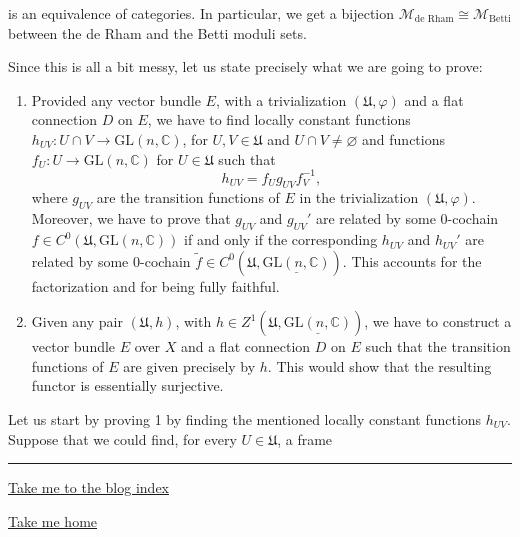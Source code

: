 \documentclass[]{article}
\begin{document}
is an equivalence of categories. In particular, we get a bijection
\(\mathcal{M}_{\text{de Rham}} \cong \mathcal{M}_{\text{Betti}}\)
between the de Rham and the Betti moduli sets.

Since this is all a bit messy, let us state precisely what we are going
to prove:

\begin{enumerate}
\def\labelenumi{\arabic{enumi}.}
\item
  Provided any vector bundle \(E\), with a trivialization
  \((\mathfrak{U},\varphi)\) and a flat connection \(D\) on \(E\), we
  have to find locally constant functions
  \(h_{UV}:U\cap V \rightarrow \mathrm{GL}(n,\mathbb{C})\), for
  \(U,V \in \mathfrak{U}\) and \(U\cap V \neq \varnothing\) and
  functions \(f_U: U \rightarrow \mathrm{GL}(n,\mathbb{C})\) for
  \(U\in \mathfrak{U}\) such that \[
  h_{UV}=f_U g_{UV} f_V^{-1},
  \] where \(g_{UV}\) are the transition functions of \(E\) in the
  trivialization \((\mathfrak{U},\varphi)\). Moreover, we have to prove
  that \(g_{UV}\) and \(g_{UV}'\) are related by some \(0\)-cochain
  \(f \in C^0(\mathfrak{U},\mathrm{GL}(n,\mathbb{C}))\) if and only if
  the corresponding \(h_{UV}\) and \(h_{UV}'\) are related by some
  \(0\)-cochain
  \(\tilde{f} \in C^0(\mathfrak{U},\underline{\mathrm{GL}(n,\mathbb{C})})\).
  This accounts for the factorization and for being fully faithful.
\item
  Given any pair \((\mathfrak{U},h)\), with
  \(h\in Z^1(\mathfrak{U},\underline{\mathrm{GL}(n,\mathbb{C})})\), we
  have to construct a vector bundle \(E\) over \(X\) and a flat
  connection \(D\) on \(E\) such that the transition functions of \(E\)
  are given precisely by \(h\). This would show that the resulting
  functor is essentially surjective.
\end{enumerate}

Let us start by proving 1 by finding the mentioned locally constant
functions \(h_{UV}\). Suppose that we could find, for every
\(U\in \mathfrak{U}\), a frame

\begin{center}\rule{0.5\linewidth}{\linethickness}\end{center}

\href{https://guillegran.github.io/blog/indice.html}{Take me to the blog
index}

\href{https://guillegran.github.io}{Take me home}
\end{document}
